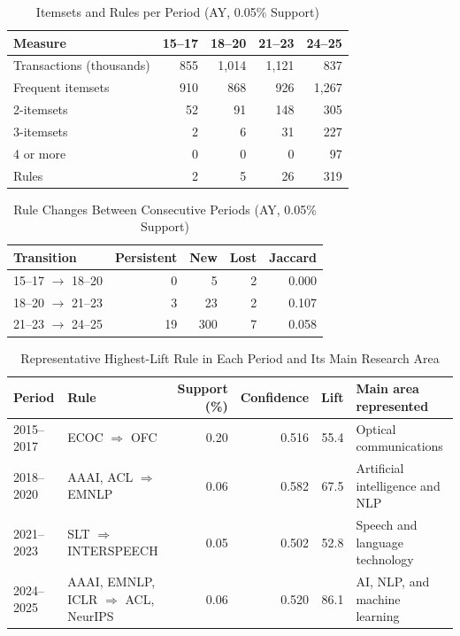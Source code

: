 ﻿\documentclass[conference]{IEEEtran}
\begin{document}
\begin{table}[t]
\caption{Itemsets and Rules per Period (AY, 0.05\% Support)}
\label{tab:temporal}
\centering
\footnotesize
\begin{tabular}{lrrrr}
\toprule
Measure & 15--17 & 18--20 & 21--23 & 24--25 \\
\midrule
Transactions (thousands) & 855 & 1,014 & 1,121 & 837 \\
Frequent itemsets & 910 & 868 & 926 & 1,267 \\
2-itemsets & 52 & 91 & 148 & 305 \\
3-itemsets & 2 & 6 & 31 & 227 \\
4 or more & 0 & 0 & 0 & 97 \\
Rules & 2 & 5 & 26 & 319 \\
\bottomrule
\end{tabular}
\end{table}

\begin{table}[t]
\caption{Rule Changes Between Consecutive Periods (AY, 0.05\% Support)}
\label{tab:ruletrans}
\centering
\footnotesize
\begin{tabular}{lrrrr}
\toprule
Transition & Persistent & New & Lost & Jaccard \\
\midrule
15--17 $\rightarrow$ 18--20 & 0 & 5 & 2 & 0.000 \\
18--20 $\rightarrow$ 21--23 & 3 & 23 & 2 & 0.107 \\
21--23 $\rightarrow$ 24--25 & 19 & 300 & 7 & 0.058 \\
\bottomrule
\end{tabular}
\end{table}

\begin{table}[t]
\caption{Representative Highest-Lift Rule in Each Period and Its Main Research Area}
\label{tab:periodrules}
\centering
\scriptsize
\setlength{\tabcolsep}{4pt}
\begin{tabular}{p{1.35cm}p{6.1cm}rrrp{4.3cm}}
\toprule
Period & Rule & Support (\%) & Confidence & Lift & Main area represented \\
\midrule
2015--2017 & ECOC $\Rightarrow$ OFC & 0.20 & 0.516 & 55.4 & Optical communications \\
2018--2020 & AAAI, ACL $\Rightarrow$ EMNLP & 0.06 & 0.582 & 67.5 & Artificial intelligence and NLP \\
2021--2023 & SLT $\Rightarrow$ INTERSPEECH & 0.05 & 0.502 & 52.8 & Speech and language technology \\
2024--2025 & AAAI, EMNLP, ICLR $\Rightarrow$ ACL, NeurIPS & 0.06 & 0.520 & 86.1 & AI, NLP, and machine learning \\
\bottomrule
\end{tabular}
\end{table}
\end{document}
